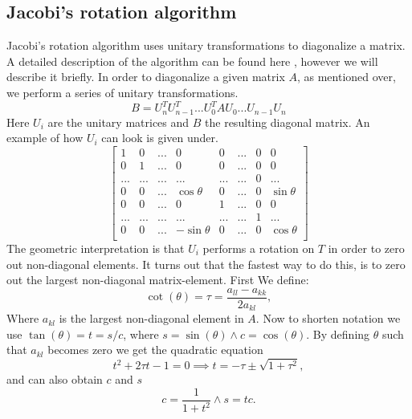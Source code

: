 \documentclass[reprint,english,notitlepage,nofootinbib]{revtex4-1}  %
\begin{document}
\subsection{Jacobi's rotation algorithm}
Jacobi's rotation algorithm uses unitary transformations to diagonalize a matrix. A detailed description of the algorithm can be found here \citep{lecnotes}, however we will describe it briefly. In order to diagonalize a given matrix $A$, as mentioned over, we perform a series of unitary transformations.
\begin{equation*}
	B = U_n^T U_{n-1}^T ... U_0^T A U_0 ... U_{n-1}U_n
\end{equation*}
Here $U_i$ are the unitary matrices and $B$ the resulting diagonal matrix. An example of how $U_i$ can look is given under.
\begin{equation*}
	  \begin{bmatrix}
	1  & 0 & ...  & 0 & 0 & ... & 0 & 0 \\
	0 & 1  & ... & 0 & 0 & ... & 0 & 0 \\
	...  & ... & ... & ... & ... & ... & 0 & ... \\
	0  & 0 & ... & \cos \theta & 0 & ... & 0 & \sin \theta \\
	0  & 0 & ... & 0 & 1 & ... & 0 & 0 \\
	...  & ...& ...  &... & ...   & ... &1 &...  \\
	0  & 0& ...  & -\sin \theta &0 & ... &0 &\cos \theta  \\
	\end{bmatrix}
\end{equation*}
The geometric interpretation is that $U_i$ performs a rotation on $T$ in order to zero out non-diagonal elements. It turns out that the fastest way to do this, is to zero out the largest non-diagonal matrix-element. First We define:
\begin{equation*}
	\cot(\theta) = \tau = \frac{a_{ll} - a_{kk}}{2a_{kl}},
\end{equation*}
Where $a_{kl}$ is the largest non-diagonal element in $A$. Now to shorten notation we use $\tan(\theta) = t = s/c$, where $s = \sin(\theta) \wedge c = \cos(\theta)$. By defining $\theta$ such that $a_{kl}$ becomes zero we get the quadratic equation
\begin{equation*}
	t^2 + 2\tau t -1 = 0 \implies t = -\tau \pm \sqrt{1+\tau^2},
\end{equation*}
and can also obtain $c$ and $s$
\begin{equation*}
	c = \frac{1}{1+t^2} \wedge s = tc.
\end{equation*}
\end{document}
